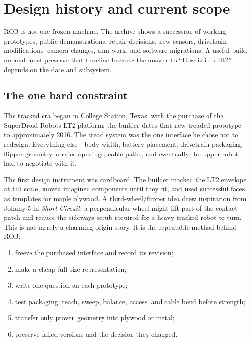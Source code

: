 \documentclass[10pt,openany]{book}
\begin{document}

\chapter{Design history and current scope}

ROB is not one frozen machine. The archive shows a succession of working prototypes, public demonstrations, repair decisions, new sensors, drivetrain modifications, camera changes, arm work, and software migrations. A useful build manual must preserve that timeline because the answer to ``How is it built?'' depends on the date and subsystem.

\section{The one hard constraint}

The tracked era began in College Station, Texas, with the purchase of the SuperDroid Robots LT2 platform; the builder dates that new treaded prototype to approximately 2016. The tread system was the one interface he chose not to redesign. Everything else---body width, battery placement, drivetrain packaging, flipper geometry, service openings, cable paths, and eventually the upper robot---had to negotiate with it.

The first design instrument was cardboard. The builder mocked the LT2 envelope at full scale, moved imagined components until they fit, and used successful faces as templates for maple plywood. A third-wheel/flipper idea drew inspiration from Johnny 5 in \textit{Short Circuit}: a perpendicular wheel might lift part of the contact patch and reduce the sideways scrub required for a heavy tracked robot to turn. This is not merely a charming origin story. It is the repeatable method behind ROB:

\begin{enumerate}
  \item freeze the purchased interface and record its revision;
  \item make a cheap full-size representation;
  \item write one question on each prototype;
  \item test packaging, reach, sweep, balance, access, and cable bend before strength;
  \item transfer only proven geometry into plywood or metal;
  \item preserve failed versions and the decision they changed.
\end{enumerate}
\end{document}
